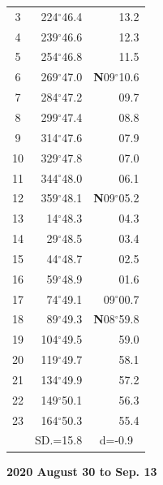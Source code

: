 \documentclass[10pt, a4paper]{report}
\begin{document}
\begin{scriptsize}
\begin{tabular*}{0.2\textwidth}[t]{@{\extracolsep{\fill}}|c|rr|}
3 & 224$^\circ$46.4 & \raisebox{0.24ex}{\boldmath$\cdot$~\boldmath$\cdot$~~}13.2\\
4 & 239$^\circ$46.6 & 12.3\\
5 & 254$^\circ$46.8 & 11.5\\[2Pt]
6 & 269$^\circ$47.0 & \textbf{N}09$^\circ$10.6\\
7 & 284$^\circ$47.2 & 09.7\\
8 & 299$^\circ$47.4 & 08.8\\
9 & 314$^\circ$47.6 & \raisebox{0.24ex}{\boldmath$\cdot$~\boldmath$\cdot$~~}07.9\\
10 & 329$^\circ$47.8 & 07.0\\
11 & 344$^\circ$48.0 & 06.1\\[2Pt]
12 & 359$^\circ$48.1 & \textbf{N}09$^\circ$05.2\\
13 & 14$^\circ$48.3 & 04.3\\
14 & 29$^\circ$48.5 & 03.4\\
15 & 44$^\circ$48.7 & \raisebox{0.24ex}{\boldmath$\cdot$~\boldmath$\cdot$~~}02.5\\
16 & 59$^\circ$48.9 & 01.6\\
17 & 74$^\circ$49.1 & 09$^\circ$00.7\\[2Pt]
18 & 89$^\circ$49.3 & \textbf{N}08$^\circ$59.8\\
19 & 104$^\circ$49.5 & 59.0\\
20 & 119$^\circ$49.7 & 58.1\\
21 & 134$^\circ$49.9 & \raisebox{0.24ex}{\boldmath$\cdot$~\boldmath$\cdot$~~}57.2\\
22 & 149$^\circ$50.1 & 56.3\\
23 & 164$^\circ$50.3 & 55.4\\
\hline
\rule{0pt}{2.4ex} & \multicolumn{1}{c}{SD.=15.8} & \multicolumn{1}{c|}{d=-0.9}\\
\hline
\end{tabular*}

\end{scriptsize}
\newpage
\sffamily
\noindent
\begin{flushright}
\textbf{2020 August 30 to Sep. 13}\par
\end{flushright}
\end{document}
